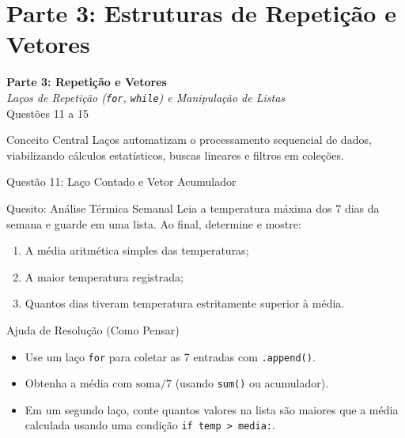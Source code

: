 \section{Parte 3: Estruturas de Repetição e Vetores}

\begin{frame}
    \begin{center}
        \LARGE \textbf{Parte 3: Repetição e Vetores}\\
        \vspace{0.3cm}
        \normalsize \textit{Laços de Repetição (\texttt{for}, \texttt{while}) e Manipulação de Listas}\\
        \vspace{0.4cm}
        \small Questões 11 a 15
    \end{center}
    \vspace{0.3cm}
    \begin{alertblock}{Conceito Central}
        Laços automatizam o processamento sequencial de dados, viabilizando cálculos estatísticos, buscas lineares e filtros em coleções.
    \end{alertblock}
\end{frame}

\begin{frame}{Questão 11: Laço Contado e Vetor Acumulador}
    \begin{block}{Quesito: Análise Térmica Semanal}
        Leia a temperatura máxima dos $7$ dias da semana e guarde em uma lista. Ao final, determine e mostre:
        \begin{enumerate}
            \item A média aritmética simples das temperaturas;
            \item A maior temperatura registrada;
            \item Quantos dias tiveram temperatura estritamente superior à média.
        \end{enumerate}
    \end{block}

    \begin{exampleblock}{Ajuda de Resolução (Como Pensar)}
        \begin{itemize}
            \item Use um laço \texttt{for} para coletar as 7 entradas com \texttt{.append()}.
            \item Obtenha a média com $\text{soma} / 7$ (usando \texttt{sum()} ou acumulador).
            \item Em um segundo laço, conte quantos valores na lista são maiores que a média calculada usando uma condição \texttt{if temp > media:}.
        \end{itemize}
    \end{exampleblock}
\end{frame}

